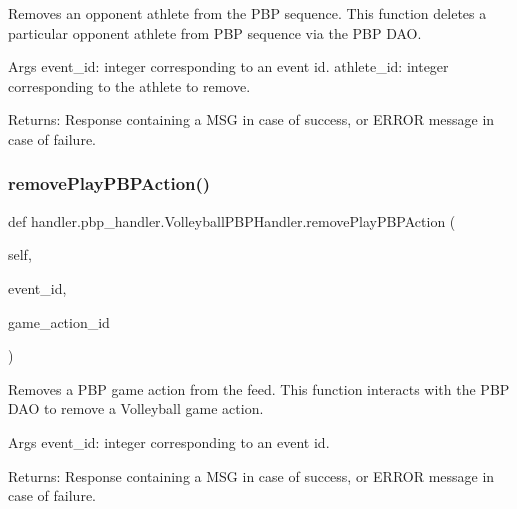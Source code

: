 \begin{DoxyVerb}Removes an opponent athlete from the PBP sequence.
This function deletes a particular opponent athlete from PBP sequence via the PBP DAO.

Args
    event_id: integer corresponding to an event id.
    athlete_id: integer corresponding to the athlete to remove.

Returns:
    Response containing a MSG in case of success, or ERROR message in case of failure.
\end{DoxyVerb}
 \mbox{\label{classhandler_1_1pbp__handler_1_1_volleyball_p_b_p_handler_ad92125b0fb3dda3cbce9462027329ec3}} 
\subsubsection{\texorpdfstring{remove\+Play\+P\+B\+P\+Action()}{removePlayPBPAction()}}
{\footnotesize\ttfamily def handler.\+pbp\+\_\+handler.\+Volleyball\+P\+B\+P\+Handler.\+remove\+Play\+P\+B\+P\+Action (\begin{DoxyParamCaption}\item[{}]{self,  }\item[{}]{event\+\_\+id,  }\item[{}]{game\+\_\+action\+\_\+id }\end{DoxyParamCaption})}

\begin{DoxyVerb}Removes a PBP game action from the feed.
This function interacts with the PBP DAO to remove a Volleyball game action.

Args
    event_id: integer corresponding to an event id.

Returns:
    Response containing a MSG in case of success, or ERROR message in case of failure.
\end{DoxyVerb}
 \mbox{\label{classhandler_1_1pbp__handler_1_1_volleyball_p_b_p_handler_a4255f84db5a5c9f4ef7922a2b9d04c0a}} 
